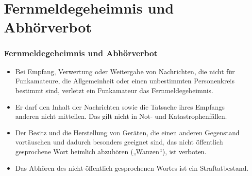 
\section{Fernmeldegeheimnis und Abhörverbot}
\label{section:fernmeldegeheimnis_abhoerverbot}
\begin{frame}%

\frametitle{Fernmeldegeheimnis und Abhörverbot}
\begin{itemize}
  \item Bei Empfang, Verwertung oder Weitergabe von Nachrichten, die nicht für Funkamateure, die Allgemeinheit oder einen unbestimmten Personenkreis bestimmt sind, verletzt ein Funkamateur das Fernmeldegeheimnis.
  \end{itemize}
\begin{itemize}
  \item Er darf den Inhalt der Nachrichten sowie die Tatsache ihres Empfangs anderen nicht mitteilen. Das gilt nicht in Not- und Katastrophenfällen.
  \end{itemize}
\end{frame}

\begin{frame}\begin{itemize}
  \item Der Besitz und die Herstellung von Geräten, die einen anderen Gegenstand vortäuschen und dadurch besonders geeignet sind, das nicht öffentlich gesprochene Wort heimlich abzuhören („Wanzen“), ist verboten.
  \end{itemize}
\begin{itemize}
  \item Das Abhören des nicht-öffentlich gesprochenen Wortes ist ein Straftatbestand.
  \end{itemize}
\end{frame}

